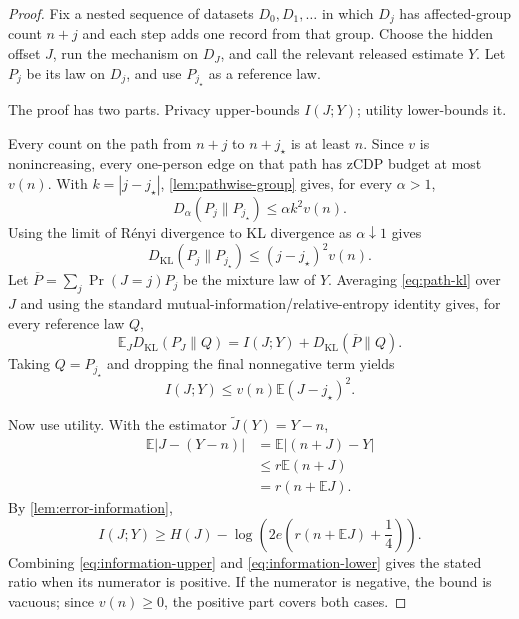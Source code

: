 \documentclass[11pt]{article}
\newcommand{\E}{\mathbb{E}}
\newcommand{\KL}{D_{\mathrm{KL}}}
\newcommand{\Dalpha}{D_{\alpha}}
\theoremstyle{definition}
\begin{document}
\begin{proof}
Fix a nested sequence of datasets $D_0,D_1,\ldots$ in which $D_j$ has affected-group count $n+j$ and each step adds one record from that group. Choose the hidden offset $J$, run the mechanism on $D_J$, and call the relevant released estimate $Y$. Let $P_j$ be its law on $D_j$, and use $P_{j_\star}$ as a reference law.

The proof has two parts. Privacy upper-bounds $I(J;Y)$; utility lower-bounds it.

Every count on the path from $n+j$ to $n+j_\star$ is at least $n$. Since $v$ is nonincreasing, every one-person edge on that path has zCDP budget at most $v(n)$. With $k=|j-j_\star|$, \cref{lem:pathwise-group} gives, for every $\alpha>1$,
\[
  \Dalpha(P_j\|P_{j_\star})
  \le \alpha k^2v(n).
\]
Using the limit of R\'enyi divergence to KL divergence as $\alpha\downarrow1$ \citep{VanErvenHarremoes2014} gives
\begin{equation}
  \KL(P_j\|P_{j_\star})
  \le
  (j-j_\star)^2v(n).
  \label{eq:path-kl}
\end{equation}
Let $\overline P=\sum_j\Pr(J=j)P_j$ be the mixture law of $Y$. Averaging \eqref{eq:path-kl} over $J$ and using the standard mutual-information/relative-entropy identity \citep{CoverThomas2006} gives, for every reference law $Q$,
\[
  \E_J\KL(P_J\|Q)
  =I(J;Y)+\KL(\overline P\|Q).
\]
Taking $Q=P_{j_\star}$ and dropping the final nonnegative term yields
\begin{equation}
  I(J;Y)
  \le
  v(n)\E(J-j_\star)^2.
  \label{eq:information-upper}
\end{equation}

Now use utility. With the estimator $\widetilde J(Y)=Y-n$,
\begin{align*}
  \E\lvert J-(Y-n)\rvert
  &=\E\lvert(n+J)-Y\rvert\\
  &\le r\E(n+J)\\
  &=r(n+\E J).
\end{align*}
By \cref{lem:error-information},
\begin{equation}
  I(J;Y)
  \ge
  H(J)-
  \log\!\left(
    2e\left(r(n+\E J)+\frac14\right)
  \right).
  \label{eq:information-lower}
\end{equation}
Combining \eqref{eq:information-upper} and \eqref{eq:information-lower} gives the stated ratio when its numerator is positive. If the numerator is negative, the bound is vacuous; since $v(n)\ge0$, the positive part covers both cases.
\end{proof}
\end{document}

